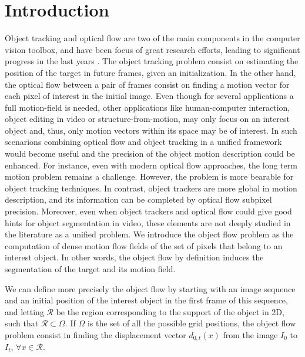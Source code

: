 
\chapter{Introduction} \label{chap:intro}

Object tracking and optical flow are two of the main components in the
computer vision toolbox, and have been focus of great research efforts, 
leading to significant progress in the last years \cite{c16}\cite{c17}. 
The object tracking problem consist on estimating the 
position of the target in future frames, given an initialization. In the
other hand, the optical flow between a pair of frames consist on finding a motion vector 
for each pixel of interest in the initial image. Even though for several
applications a full motion-field is needed, other applications like
human-computer interaction, object editing in video or structure-from-motion,
may only focus on an interest object and, thus, only motion vectors within its 
space may be of interest. 
In such scenarions combining optical flow and object tracking in a unified 
framework would become useful and the precision of the object motion description 
could be enhanced. For instance, even with modern optical flow approaches, 
the long term motion problem remains a challenge. However, the problem is more 
bearable for object tracking techniques. In contrast, object trackers are more global 
in motion description, and its information can be completed by optical flow subpixel 
precision. Moreover,  even when object
trackers and optical flow could give good hints for object segmentation in video, 
these elements are not deeply studied in the literature as a unified problem.
We introduce the object flow problem as the computation of dense motion 
flow fields of the set of pixels that belong to an interest object. In other words, 
the object flow by definition induces the segmentation of the target and its motion field.

We can define more precisely the object flow by starting with an image sequence and an initial 
position of the interest object in the first frame of this sequence, and letting $\mathcal{R}$ 
be the region corresponding to the support of the object in 2D, such that 
$\mathcal{R} \subset \Omega$. If $\Omega$ is the set of all the possible grid positions, 
the object flow problem consist in finding the displacement vector $d_{0,t}(x)$ from the image $I_{0}$ to $I_{t}$, $\forall x \in \mathcal{R}$.

